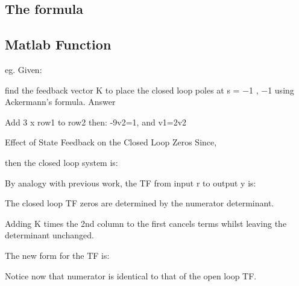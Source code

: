 \subsection*{The formula} %
\label{sub:the_formula}


\ifslidesonly
\begin{slide}
   
\end{slide}
\fi


\ifslidesonly
\begin{slide}
   
\end{slide}
\fi


\ifslidesonly
\begin{slide}
   
\end{slide}
\fi

\subsection*{Matlab Function}

\ifslidesonly
\begin{slide}
   
\end{slide}
\fi

 
eg. Given:
 
find the feedback vector K to place the closed loop poles at s = −1 , −1 using Ackermann's formula.
Answer
 
 
 
 
Add 3 x row1 to row2 then:  -9v2=1, and v1=2v2  
 

 
Effect of State Feedback on the Closed Loop Zeros
Since,
 

then the closed loop system is:

 

By analogy with previous work, the TF from input  r  to output  y  is:

 

 
The closed loop TF zeros are determined by the numerator determinant.

Adding K times the 2nd column to the first cancels terms whilst leaving the determinant unchanged.

The new form for the TF is:

 

Notice now that numerator is identical to that of the open loop TF.

